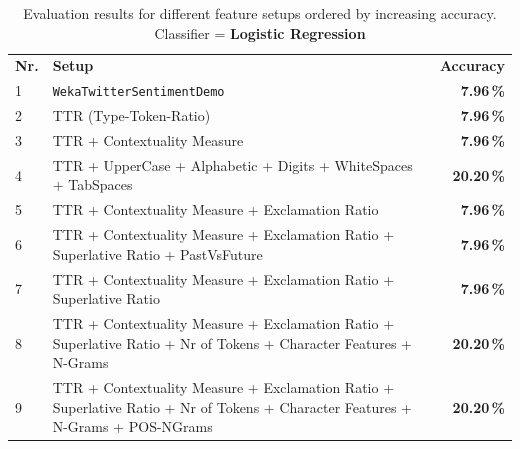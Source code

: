 \documentclass[journal, a4paper, 12pt]{IEEEtran}
\begin{document}
\begin{table}[!hbt]
	\begin{center}
		\caption{Evaluation results for different feature setups ordered by increasing accuracy.
		Classifier = \textbf{Logistic Regression}}
		\label{tab:results-logistic}
		\begin{tabularx}{80mm}{| l | X | r |}
			\hline
			\rowcolor{lightgray}
			\multicolumn{3}{| c |}{\textbf{Logistic Regression}} 								\\ \hline
			\rowcolor{lightgray}
			\textbf{Nr.}		&	\textbf{Setup}					& \textbf{Accuracy}		\\ \hline\hline
			1			&	\texttt{WekaTwitterSentimentDemo}	& \textbf{7.96\,\%}		\\ \hline
			2			&	TTR (Type-Token-Ratio)				& \textbf{7.96\,\%}		\\ \hline
			3			&	TTR + Contextuality Measure			& \textbf{7.96\,\%}		\\ \hline
			4			&	TTR + UpperCase + Alphabetic + Digits + WhiteSpaces + TabSpaces
																& \textbf{20.20\,\%}		\\ \hline
			5			& 	TTR + Contextuality Measure + Exclamation Ratio
																& \textbf{7.96\,\%}		\\ \hline
			6			&	TTR + Contextuality Measure + Exclamation Ratio + Superlative Ratio + PastVsFuture 
																& \textbf{7.96\,\%}		\\ \hline
			7			&	TTR + Contextuality Measure + Exclamation Ratio + Superlative Ratio 
																& \textbf{7.96\,\%}		\\ \hline
			8			&	TTR + Contextuality Measure + Exclamation Ratio + Superlative Ratio +
							Nr of Tokens + Character Features + N-Grams
																& \textbf{20.20\,\%}		\\ \hline
			9			&	TTR + Contextuality Measure + Exclamation Ratio + Superlative Ratio +
							Nr of Tokens + Character Features + N-Grams + POS-NGrams
																& \textbf{20.20\,\%}		\\ \hline
			\hline
		\end{tabularx}
	\end{center}
\end{table}
\end{document}
